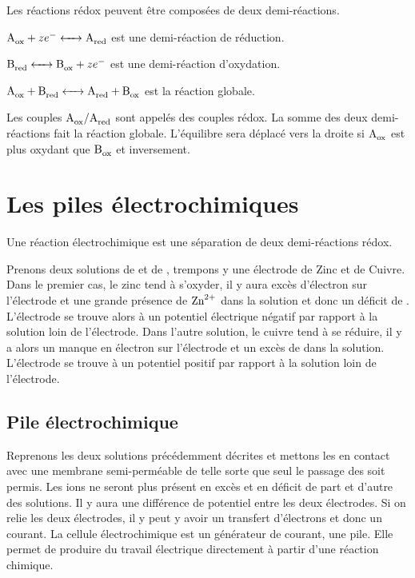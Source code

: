 Les réactions rédox peuvent être composées de deux demi-réactions.

$\ce{A_{ox}}+ze^- \ce{<-> A_{red}}$
est une demi-réaction de réduction.

$\ce{B_{red} <-> B_{ox} +}ze^-$
est une demi-réaction d'oxydation.

$\ce{A_{ox} + B_{red} <-> A_{red} + B_{ox}}$
est la réaction globale.

Les couples $\ce{A_{ox}}/\ce{A_{red}}$ sont appelés des couples rédox.
La somme des deux demi-réactions fait la réaction globale.
L'équilibre sera déplacé vers la droite si $\ce{A_{ox}}$ est
plus oxydant que $\ce{B_{ox}}$ et inversement.

\section{Les piles électrochimiques}
Une réaction électrochimique est une séparation de deux demi-réactions rédox.

Prenons deux solutions de  et de ,
trempons y une électrode de Zinc et de Cuivre.
Dans le premier cas, le zinc tend à s'oxyder,
il y aura excès d'électron sur l'électrode et une grande présence de
$\ce{Zn^{2+}}$
dans la solution et donc un déficit de .
L'électrode se trouve alors à un potentiel électrique négatif
par rapport à la solution loin de l'électrode.
Dans l'autre solution, le cuivre tend à se réduire,
il y a alors un manque en électron sur l'électrode et
un excès de  dans la solution.
L'électrode se trouve à un potentiel positif
par rapport à la solution loin de l'électrode.

\subsection{Pile électrochimique}
Reprenons les deux solutions précédemment décrites et mettons les en contact
avec une membrane semi-perméable de telle sorte que
seul le passage des  soit permis.
Les ions  ne seront plus présent en excès et
en déficit de part et d'autre des solutions.
Il y aura une différence de potentiel entre les deux électrodes.
Si on relie les deux électrodes,
il y peut y avoir un transfert d'électrons et donc un courant.
La cellule électrochimique est un générateur de courant, une pile.
Elle permet de produire du travail électrique directement
à partir d'une réaction chimique.


